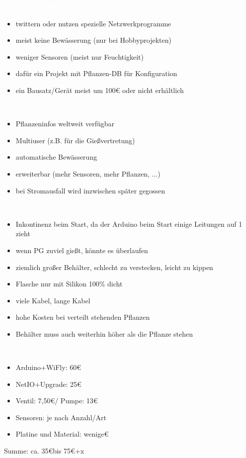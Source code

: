 \documentclass[bigger]{beamer}
\newcommand{\topic}[1]{{\huge{\textcolor{white}{\textbf{#1}}}}}
\begin{document}
\begin{frame}{\topic{Vergleich (andere Projekte)}}
	\begin{itemize}
		\item twittern oder nutzen spezielle Netzwerkprogramme
		\item meist keine Bewässerung (nur bei Hobbyprojekten)
		\item weniger Sensoren (meist nur Feuchtigkeit)
		\item dafür ein Projekt mit Pflanzen-DB für Konfiguration
		\item ein Bausatz/Gerät meist um {100\euro} oder nicht erhältlich
	\end{itemize}
\end{frame}

\begin{frame}{\topic{Vorteile}}
	\begin{itemize}
		\item Pflanzeninfos weltweit verfügbar
		\item Multiuser (z.B. für die Gießvertretung)
		\item automatische Bewässerung
		\item erweiterbar (mehr Sensoren, mehr Pflanzen, ...)
		\item bei Stromausfall wird inzwischen später gegossen
	\end{itemize}
\end{frame}

\begin{frame}{\topic{Probleme}}
	\begin{itemize}
		\item Inkontinenz beim Start, da der Arduino beim Start einige Leitungen auf 1 zieht
		\item wenn PG zuviel gießt, könnte es überlaufen
		\item ziemlich großer Behälter, schlecht zu verstecken, leicht zu kippen
		\item Flasche nur mit Silikon 100\% dicht
		\item viele Kabel, lange Kabel
		\item hohe Kosten bei verteilt stehenden Pflanzen
		\item Behälter muss auch weiterhin höher als die Pflanze stehen
	\end{itemize}
\end{frame}

\begin{frame}{\topic{Kosten}}
	\begin{itemize}
		\item Arduino+WiFly: 60\euro
		\item NetIO+Upgrade: 25\euro
		\item Ventil: 7,50\euro / Pumpe: 13\euro
		\item Sensoren: je nach Anzahl/Art
		\item Platine und Material: wenige\euro
	\end{itemize}
	Summe: ca. 35\euro  bis 75\euro  +x
\end{frame}
\end{document}
